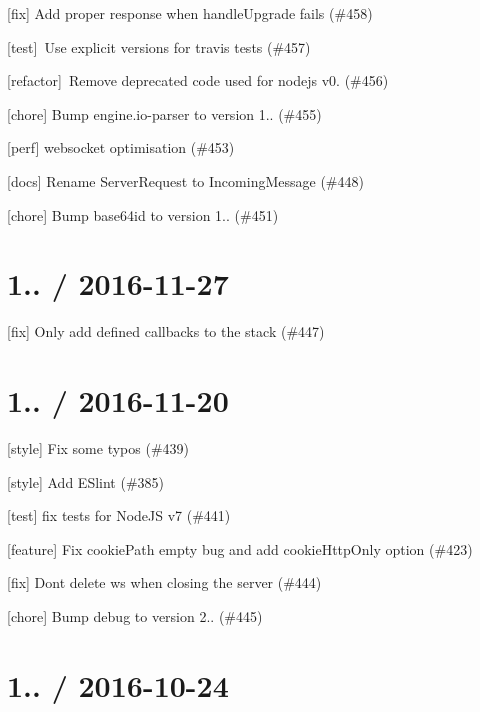 
\begin{DoxyItemize}
\item \mbox{[}fix\mbox{]} Add proper response when handle\+Upgrade fails (\#458)
\item \mbox{[}test\mbox{]} \+Use explicit versions for travis tests (\#457)
\item \mbox{[}refactor\mbox{]} \+Remove deprecated code used for nodejs v0. (\#456)
\item \mbox{[}chore\mbox{]} Bump engine.\+io-\/parser to version 1.. (\#455)
\item \mbox{[}perf\mbox{]} websocket optimisation (\#453)
\item \mbox{[}docs\mbox{]} Rename Server\+Request to Incoming\+Message (\#448)
\item \mbox{[}chore\mbox{]} Bump base64id to version 1.. (\#451)
\end{DoxyItemize}

\section*{1.. / 2016-\/11-\/27 }


\begin{DoxyItemize}
\item \mbox{[}fix\mbox{]} Only add defined callbacks to the stack (\#447)
\end{DoxyItemize}

\section*{1.. / 2016-\/11-\/20 }


\begin{DoxyItemize}
\item \mbox{[}style\mbox{]} Fix some typos (\#439)
\item \mbox{[}style\mbox{]} Add E\+Slint (\#385)
\item \mbox{[}test\mbox{]} fix tests for Node\+JS v7 (\#441)
\item \mbox{[}feature\mbox{]} Fix cookie\+Path empty bug and add cookie\+Http\+Only option (\#423)
\item \mbox{[}fix\mbox{]} Don\textquotesingle{}t delete ws when closing the server (\#444)
\item \mbox{[}chore\mbox{]} Bump debug to version 2.. (\#445)
\end{DoxyItemize}

\section*{1.. / 2016-\/10-\/24 }


